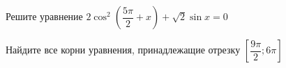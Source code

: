 \begin{ex}
	\begin{condition}
		\begin{enumcols}[label=\asbuk*)]
			\item Решите уравнение \( 2\cos^2 {\left(\dfrac{5\pi}{2}+x\right)} + \sqrt{2}\sin x = 0 \)
			\item Найдите все корни уравнения, принадлежащие отрезку \( \left[\dfrac{9\pi}{2};6\pi\right] \)
		\end{enumcols}
	\end{condition}
\end{ex}